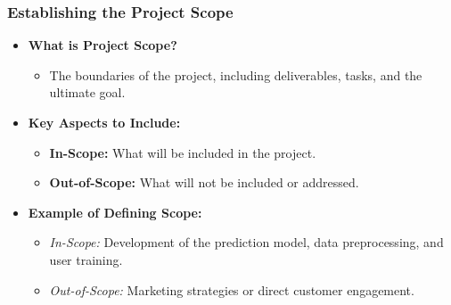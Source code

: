 \documentclass[aspectratio=169]{beamer}
\begin{document}
\begin{frame}[fragile]
    \frametitle{Establishing the Project Scope}
    \begin{itemize}
        \item \textbf{What is Project Scope?}
        \begin{itemize}
            \item The boundaries of the project, including deliverables, tasks, and the ultimate goal.
        \end{itemize}
        
        \item \textbf{Key Aspects to Include:}
        \begin{itemize}
            \item \textbf{In-Scope:} What will be included in the project.
            \item \textbf{Out-of-Scope:} What will not be included or addressed.
        \end{itemize}
        
        \item \textbf{Example of Defining Scope:}
        \begin{itemize}
            \item \textit{In-Scope:} Development of the prediction model, data preprocessing, and user training.
            \item \textit{Out-of-Scope:} Marketing strategies or direct customer engagement.
        \end{itemize}
    \end{itemize}
\end{frame}
\end{document}
